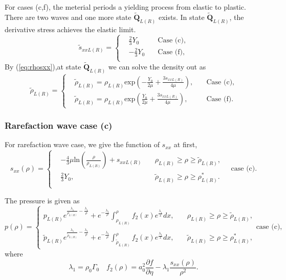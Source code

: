 \documentclass[review]{elsarticle}
\begin{document}
For cases (c,f), the meterial periods a yielding process from elastic to plastic. There are two waves and  one more state $\tilde{\mathbf{Q}}_{L(R)}$ exists. In state $\tilde{\mathbf{Q}}_{L(R)}$, the derivative stress achieves the elastic limit. 
\begin{equation}
 \tilde{s}_{xxL(R)} = \left\{ \begin{align}
	 &\frac{2}{3}Y_0 \quad  &\text{Case (c)},\\
	 &-\frac{2}{3}Y_0 \quad &\text{Case (f)},\\
	\end{align}
  \right.
\end{equation}
By (\ref{eq:rhosxx}),at state $\tilde{\mathbf{Q}}_{L(R)}$ we can solve the density out as 
\begin{equation}
  \tilde{\rho}_{L(R)}= \left\{ \begin{align}
	  &\widetilde{\rho}_{L(R)} = \rho_{L(R)} \text{exp}\left(-\frac{Y_0}{2\mu}+\frac{3 s_{xxL(R)}}{4\mu}\right), \quad  & \text{Case (c)}, \\ 
	  &\widetilde{\rho}_{L(R)} = \rho_{L(R)} \text{exp}\left(\frac{Y_0}{2\mu}+\frac{3 s_{xxL(R)}}{4\mu}\right), \quad  & \text{Case (f)}. 
	\end{align}
  \right.
	\end{equation}
\subsubsection{Rarefaction wave case (c)}
For rarefaction wave case,
we give the function of $s_{xx}$ at first,
\begin{equation}
  s_{xx}(\rho) = \left\{\begin{aligned}
	& -\frac{4}{3}\mu\text{ln}\left(\frac{\rho}{\rho_{L(R)}}\right)+s_{xxL(R)} \quad  & \rho_{L(R)} \ge \rho \ge \tilde{\rho}_{L(R)}  ,\\
	& \frac{2}{3}Y_0, & \tilde{\rho}_{L(R)} \ge \rho \ge \rho_{L(R)}^*.\\
  \end{aligned} \right. \quad \text{case (c)}.
  \end{equation}

The pressure is given as 
\begin{equation}
  p(\rho)= \left\{ \begin{aligned}
	  p_{L(R)}e^{\frac{\lambda_1}{\rho_{L(R)}}-\frac{\lambda_1}{\rho}} +e^{-\frac{\lambda_1}{\rho}}\int_{\rho_{L(R)}}^{\rho} f_2(x) e^{\frac{\lambda_1}{x}}dx,\quad & \rho_{L(R)}\ge \rho \ge \tilde{\rho}_{L(R)},\\
	  \tilde{p}_{L(R)}e^{\frac{\lambda_1}{\tilde{\rho}_{L(R)}}-\frac{\lambda_1}{\rho}} +e^{-\frac{\lambda_1}{\rho}}\int_{\tilde{\rho}_{L(R)}}^{\rho} f_2(x) e^{\frac{\lambda_1}{x}}dx,  \quad & \tilde{\rho}_{L(R)}\ge \rho \ge \rho_{L(R)}^*,
  \end{aligned} \right.
  \text{case (c)},
\end{equation}
where 
\begin{equation}
  \lambda_1 = \rho_0 \Gamma_0 \quad f_2(\rho) = a_0^2\frac{\partial f}{\partial \eta}- \lambda_1\frac{s_{xx}(\rho)}{\rho^2}.
\end{equation}
\end{document}
